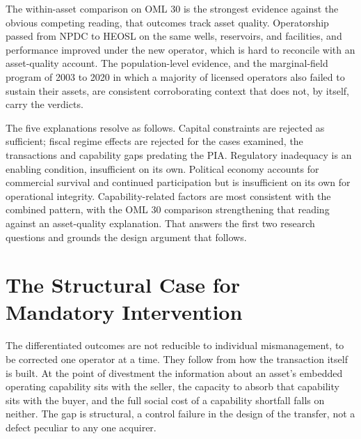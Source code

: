 The within-asset comparison on OML 30 is the strongest evidence against
the obvious competing reading, that outcomes track asset quality.
Operatorship passed from NPDC to HEOSL on the same wells, reservoirs,
and facilities, and performance improved under the new operator, which
is hard to reconcile with an asset-quality account. The population-level
evidence, and the marginal-field program of 2003 to 2020 in which a
majority of licensed operators also failed to sustain their assets, are
consistent corroborating context that does not, by itself, carry the
verdicts.

The five explanations resolve as follows. Capital constraints are
rejected as sufficient; fiscal regime effects are rejected for the cases
examined, the transactions and capability gaps predating the PIA.
Regulatory inadequacy is an enabling condition, insufficient on its own.
Political economy accounts for commercial survival and continued
participation but is insufficient on its own for operational integrity.
Capability-related factors are most consistent with the combined
pattern, with the OML 30 comparison strengthening that reading against
an asset-quality explanation. That answers the first two research
questions and grounds the design argument that follows.

\hypertarget{the-structural-case-for-mandatory-intervention}{%
\section{The Structural Case for Mandatory
Intervention}\label{the-structural-case-for-mandatory-intervention}}

The differentiated outcomes are not reducible to individual
mismanagement, to be corrected one operator at a time. They follow from
how the transaction itself is built. At the point of divestment the
information about an asset's embedded operating capability sits with the
seller, the capacity to absorb that capability sits with the buyer, and
the full social cost of a capability shortfall falls on neither. The gap
is structural, a control failure in the design of the transfer, not a
defect peculiar to any one acquirer.

